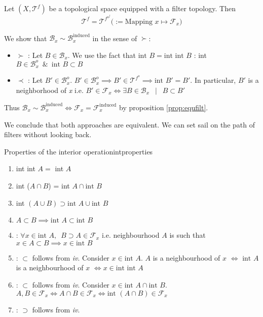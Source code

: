 \begin{myprop}{}{}
	Let $(X, \mathcal{T}^f)$ be a topological space equipped with a filter topology. Then
	$$\mathcal{T}^f = \mathcal{T}^{f^{o^f}} \big(:= \textrm{Mapping } x \mapsto \mathcal{F}_x \big)$$
\end{myprop}
\begin{myproof} 
	We show that $\mathcal{B}_x \sim \mathcal{B}_x^\textrm{induced}$ in the sense of $\succ$: 
	\begin{itemize}
		\item $\succ$ : Let $B\in \mathcal{B}_x$. We use the fact that $\textrm{int } B = \textrm{int int } B$ : int $B \in \mathcal{B}_x^o \enspace \& \enspace \textrm{int } B \subset B$
		\item $\prec$ : Let $B'\in \mathcal{B}_x^o$. $B'\in \mathcal{B}_x^o \implies B' \in \mathcal{T}^{f^o} \implies \textrm{int } B' = B'$. In particular, $B'$ is a neighborhood of \textit{x} i.e. $B' \in \mathcal{F}_x \iff \exists B \in \mathcal{B}_x \enspace \mid \enspace B \subset B'$
	\end{itemize}
	Thus $\mathcal{B}_x \sim \mathcal{B}_x^\textrm{induced} \iff \mathcal{F}_x = \mathcal{F}_x^{\textrm{induced}}$ by proposition \ref{prop:equfilt}.
\end{myproof}
We conclude that both approaches are equivalent. We can set sail on the path of filters without looking back.
\begin{myprop}{Properties of the interior operation}{intproperties}
	\begin{enumerate}[label=\roman*.]
		\item int int $A =$ int $A$
		\item int ($A \cap B$) = int $A \cap \textrm{int } B$  
		\item int $(A \cup B) \supset \textrm{int } A \cup \textrm{int } B$
		\item $A \subset B \implies \textrm{int } A \subset \textrm{int } B$
	\end{enumerate}
\end{myprop}
\begin{myproof}
	\begin{enumerate}[label=\roman*]
		\setcounter{enumi}{3}
		\item : $\forall x \in \textrm{int } A, \enspace B \supset A \in \mathcal{F}_x$ i.e. neighbourhood $A$ is such that $x \in A \subset B \implies x \in \textrm{int } B$
		\setcounter{enumi}{0}
		\item : $\subset$ follows from \textit{iv}. Consider $x \in \textrm{int } A$. $A$ is a neighbourhood of $x$ $\iff$ $\textrm{int } A$ is a neighbourhood of $x$ $\iff x \in \textrm{int int } A$
		\item : $\subset$ follows from \textit{iv}. Consider $x\in \textrm{int } A \cap \textrm{int } B$. $A, B \in \mathcal{F}_x \iff A\cap B \in \mathcal{F}_x \iff \textrm{int }(A\cap B) \in \mathcal{F}_x$
		\item : $\supset$ follows from \textit{iv}.
	\end{enumerate}
\end{myproof}

